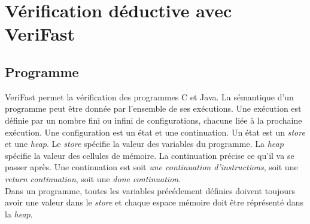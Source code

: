 \documentclass[11pt,openany]{article}
\newcommand{\verifast}{VeriFast}
\begin{document}
\section{V\'erification d\'eductive avec \verifast{}}
	\subsection{Programme}
		\verifast{} permet la v\'erification des programmes C et Java. La s\'emantique d'un programme peut \^etre donn\'ee par l'ensemble de ses ex\'ecutions. Une ex\'ecution est d\'efinie par un nombre fini ou infini de configurations, chacune li\'ee \`a la prochaine ex\'ecution. Une configuration est un \'etat et une continuation. Un \'etat est un \textit{store} et une \textit{heap}. Le \textit{store} sp\'ecifie la valeur des variables du programme. La \textit{heap} sp\'ecifie la valeur des cellules de m\'emoire. La continuation pr\'ecise ce qu'il va se passer apr\`es. Une continuation est soit \textit{une continuation d'instructions}, soit une \textit{return continuation}, soit une \textit{done continuation}.\\
	Dans un programme, toutes les variables pr\'ec\'edement d\'efinies doivent toujours avoir une valeur dans le \textit{store} et chaque espace m\'emoire doit \^etre r\'epr\'esent\'e dans la \textit{heap}.
\end{document}
